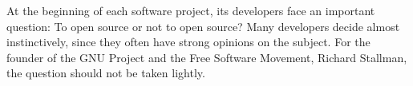 At the beginning of each software project, its developers face an important
question: To open source or not to open source? Many developers decide almost
instinctively, since they often have strong opinions on the subject. For the
founder of the GNU Project and the Free Software Movement, Richard Stallman, the
question should not be taken lightly.
